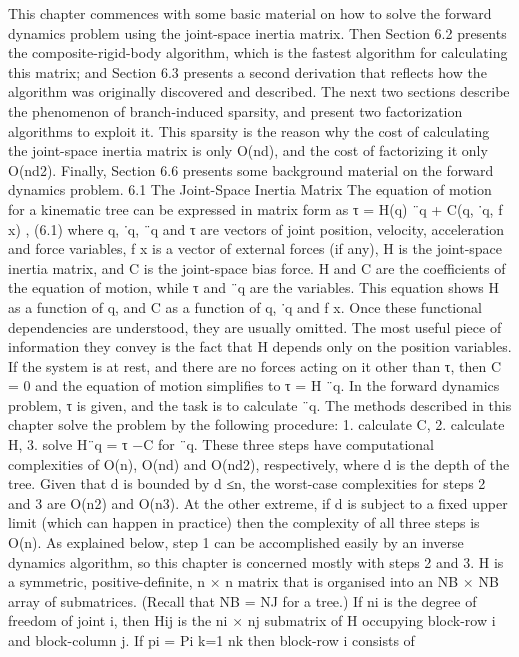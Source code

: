 This chapter commences with some basic material on how to solve the forward dynamics problem using the joint-space inertia matrix. Then Section 6.2 presents the composite-rigid-body algorithm, which is the fastest algorithm for calculating this matrix; and Section 6.3 presents a second derivation that reflects how the algorithm was originally discovered and described. The next two sections describe the phenomenon of branch-induced sparsity, and present two factorization algorithms to exploit it. This sparsity is the reason why the cost of calculating the joint-space inertia matrix is only O(nd), and the cost of factorizing it only O(nd2). Finally, Section 6.6 presents some background material on the forward dynamics problem. 6.1 The Joint-Space Inertia Matrix The equation of motion for a kinematic tree can be expressed in matrix form as τ = H(q) ¨q + C(q, ˙q, f x) , (6.1) where q, ˙q, ¨q and τ are vectors of joint position, velocity, acceleration and force variables, f x is a vector of external forces (if any), H is the joint-space inertia matrix, and C is the joint-space bias force. H and C are the coefficients of the equation of motion, while τ and ¨q are the variables. This equation shows H as a function of q, and C as a function of q, ˙q and f x. Once these functional dependencies are understood, they are usually omitted. The most useful piece of information they convey is the fact that H depends only on the position variables. If the system is at rest, and there are no forces acting on it other than τ, then C = 0 and the equation of motion simplifies to τ = H ¨q. In the forward dynamics problem, τ is given, and the task is to calculate ¨q. The methods described in this chapter solve the problem by the following procedure: 1. calculate C, 2. calculate H, 3. solve H¨q = τ −C for ¨q. These three steps have computational complexities of O(n), O(nd) and O(nd2), respectively, where d is the depth of the tree. Given that d is bounded by d ≤n, the worst-case complexities for steps 2 and 3 are O(n2) and O(n3). At the other extreme, if d is subject to a fixed upper limit (which can happen in practice) then the complexity of all three steps is O(n). As explained below, step 1 can be accomplished easily by an inverse dynamics algorithm, so this chapter is concerned mostly with steps 2 and 3. H is a symmetric, positive-definite, n × n matrix that is organised into an NB × NB array of submatrices. (Recall that NB = NJ for a tree.) If ni is the degree of freedom of joint i, then Hij is the ni × nj submatrix of H occupying block-row i and block-column j. If pi = Pi k=1 nk then block-row i consists of

